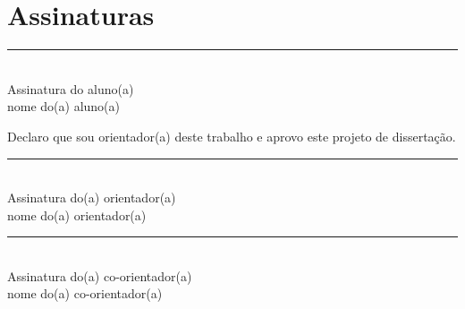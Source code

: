 \documentclass[a4paper, 11pt]{article}
\begin{document}
\newpage
\printbibliography[title={Referências Bibliográficas}]



\newpage
\section{Assinaturas}

\vspace{3cm}
\centering
\rule{6cm}{0.4pt} \\
Assinatura do aluno(a) \\
nome do(a) aluno(a)

\vspace{3cm}
Declaro que sou orientador(a) deste trabalho e aprovo este projeto de dissertação.

\vspace{3cm}
\centering
\rule{6cm}{0.4pt} \\
Assinatura do(a) orientador(a) \\
nome do(a) orientador(a)

\vspace{3cm}
\centering
\rule{6cm}{0.4pt} \\
Assinatura do(a) co-orientador(a) \\
nome do(a) co-orientador(a)
\end{document}
